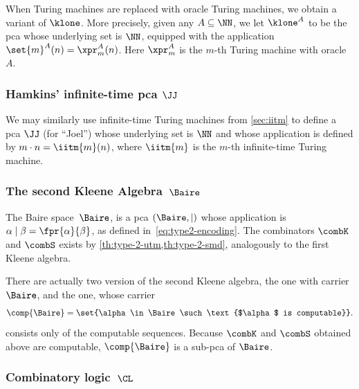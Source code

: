 When Turing machines are replaced with oracle Turing machines, we obtain a variant of $\klone$. More precisely, given any $A \subseteq \NN$, we let $\klone^A$ to be the pca whose underlying set is $\NN$, equipped with the application $\set{m}^A(n) = \xpr^A_m(n)$. Here $\xpr^A_m$ is the $m$-th Turing machine with oracle~$A$.

\subsubsection[\texorpdfstring%
{Hamkins' intfinite-time pca $\JJ$}%
{Hamkins' infinite-time pca $\JJ$}%
]{Hamkins' infinite-time pca $\JJ$}
\label{sec:hamkins-pca-oracle}%

We may similarly use infinite-time Turing machines from \cref{sec:iitm} to define a pca $\JJ$ (for ``Joel'') whose underlying set is $\NN$ and whose application is defined by $m \cdot n = \iitm{m}(n)$, where $\iitm{m}$ is the $m$-th infinite-time Turing machine.


\subsubsection[\texorpdfstring%
{The second Kleene Algebra $\Baire$}%
{The second Kleene Algebra B}%
]{The second Kleene Algebra~$\Baire$}
\label{sec:second-kleene-pca}

The Baire space~$\Baire$, is a pca $(\Baire, {\mid})$ whose application is $\alpha \mid \beta = \fpr{\alpha}{\beta}$, as defined in~\eqref{eq:type2-encoding}. The combinators $\combK$ and $\combS$ exists by \cref{th:type-2-utm,th:type-2-smd}, analogously to the first Kleene algebra.

There are actually two version of the second Kleene algebra, the  one
with carrier~$\Baire$, and the  one, whose carrier
%
\begin{equation*}
  \comp{\Baire} = \set{\alpha \in \Baire \such \text{$\alpha$ is computable}}.
\end{equation*}
%
consists only of the computable sequences. Because $\combK$ and $\combS$ obtained above are computable, $\comp{\Baire}$ is a sub-pca of $\Baire$.

\subsubsection{Combinatory logic~$\CL$}
\label{sec:combinatory-logic-pca}

